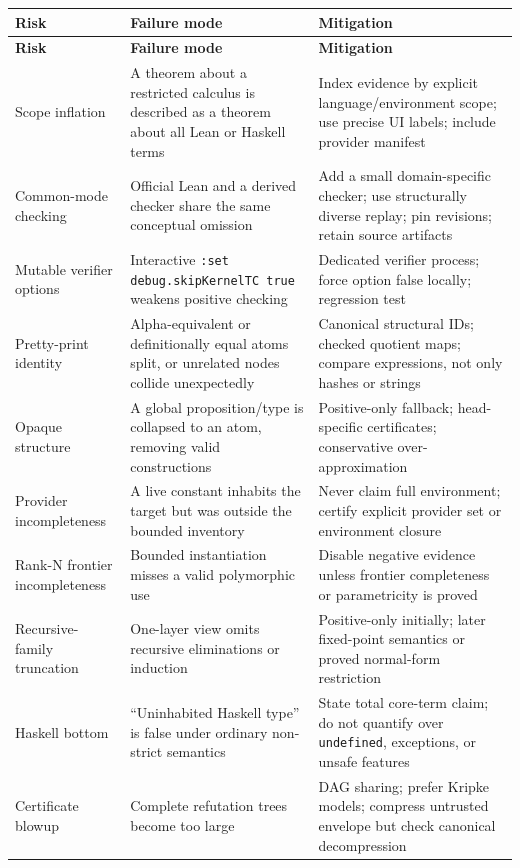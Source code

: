 \documentclass[11pt,letterpaper,openany]{report}
\theoremstyle{definition}
\theoremstyle{remark}
\newcommand{\code}[1]{\texttt{#1}}
\begin{document}
\begin{longtable}{L{0.21\textwidth} L{0.31\textwidth} L{0.39\textwidth}}
\toprule
\textbf{Risk} & \textbf{Failure mode} & \textbf{Mitigation} \\
\midrule
\endfirsthead
\toprule
\textbf{Risk} & \textbf{Failure mode} & \textbf{Mitigation} \\
\midrule
\endhead
Scope inflation & A theorem about a restricted calculus is described as a theorem about all Lean or Haskell terms & Index evidence by explicit language/environment scope; use precise UI labels; include provider manifest \\
Common-mode checking & Official Lean and a derived checker share the same conceptual omission & Add a small domain-specific checker; use structurally diverse replay; pin revisions; retain source artifacts \\
Mutable verifier options & Interactive \code{:set debug.skipKernelTC true} weakens positive checking & Dedicated verifier process; force option false locally; regression test \\
Pretty-print identity & Alpha-equivalent or definitionally equal atoms split, or unrelated nodes collide unexpectedly & Canonical structural IDs; checked quotient maps; compare expressions, not only hashes or strings \\
Opaque structure & A global proposition/type is collapsed to an atom, removing valid constructions & Positive-only fallback; head-specific certificates; conservative over-approximation \\
Provider incompleteness & A live constant inhabits the target but was outside the bounded inventory & Never claim full environment; certify explicit provider set or environment closure \\
Rank-N frontier incompleteness & Bounded instantiation misses a valid polymorphic use & Disable negative evidence unless frontier completeness or parametricity is proved \\
Recursive-family truncation & One-layer view omits recursive eliminations or induction & Positive-only initially; later fixed-point semantics or proved normal-form restriction \\
Haskell bottom & ``Uninhabited Haskell type'' is false under ordinary non-strict semantics & State total core-term claim; do not quantify over \code{undefined}, exceptions, or unsafe features \\
Certificate blowup & Complete refutation trees become too large & DAG sharing; prefer Kripke models; compress untrusted envelope but check canonical decompression \\

\end{longtable}
\end{document}
